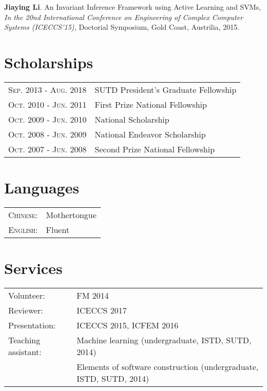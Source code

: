 \documentclass[a4paper,10pt]{article}
\begin{document}
\textbf{Jiaying Li}. An Invariant Inference Framework using Active Learning and SVMs, {\sl In the 20nd International Conference on Engineering of Complex Computer Systems (ICECCS'15),} Doctorial Symposium, Gold Coast, Austrilia, 2015.




\section{Scholarships}
\begin{tabular}{ll}
\textsc{Sep.} 2013 - \textsc{Aug.} 2018 & SUTD President’s Graduate Fellowship \\
\textsc{Oct.} 2010 - \textsc{Jun.} 2011 & First Prize National Fellowship \\
\textsc{Oct.} 2009 - \textsc{Jun.} 2010 & National Scholarship \\
\textsc{Oct.} 2008 - \textsc{Jun.} 2009 & National Endeavor Scholarship \\
\textsc{Oct.} 2007 - \textsc{Jun.} 2008 & Second Prize National Fellowship \\
\end{tabular}



\section{Languages}
\begin{tabular}{rl}
	\textsc{Chinese:}&Mothertongue\\
	\textsc{English:}&Fluent\\
\end{tabular}



\section{Services}
\begin{tabular}{ll}
Volunteer:&FM 2014\\
Reviewer: &ICECCS 2017\\
Presentation: &ICECCS 2015, ICFEM 2016\\
Teaching assistant:&Machine learning (undergraduate, ISTD, SUTD, 2014)\\
&Elements of software construction (undergraduate, ISTD, SUTD, 2014)
\end{tabular}
\end{document}

